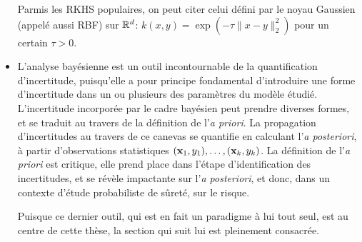 \begin{itemize}
        Parmis les RKHS populaires, on peut citer celui défini par le noyau Gaussien (appelé aussi RBF) sur $\mathbb{R}^d$: $k(x,y)=\exp(-\tau\|x-y\|^2_2)$ pour un certain $\tau>0$.




    \item L'analyse bayésienne est un outil incontournable de la quantification d'incertitude, puisqu'elle a pour principe fondamental d'introduire une forme d'incertitude dans un ou plusieurs des paramètres du modèle étudié. 
    L'incertitude incorporée par le cadre bayésien peut prendre diverses formes, et se traduit au travers de la définition de l'\emph{a priori}. 
    La propagation d'incertitudes au travers de ce canevas se quantifie en calculant l'\emph{a posteriori}, à partir d'observations statistiques $(\mathbf{x}_1,y_1),\dots,(\mathbf{x}_k, y_k)$.
    La définition de l'\emph{a priori} est critique, elle prend place dans l'étape d'identification des incertitudes, et se révèle impactante sur l'\emph{a posteriori}, et donc, dans un contexte d'étude probabiliste de sûreté, sur le risque.
    
    Puisque ce dernier outil, qui est en fait un paradigme à lui tout seul, est au centre de cette thèse, la section qui suit lui est pleinement consacrée.
\end{itemize}
















